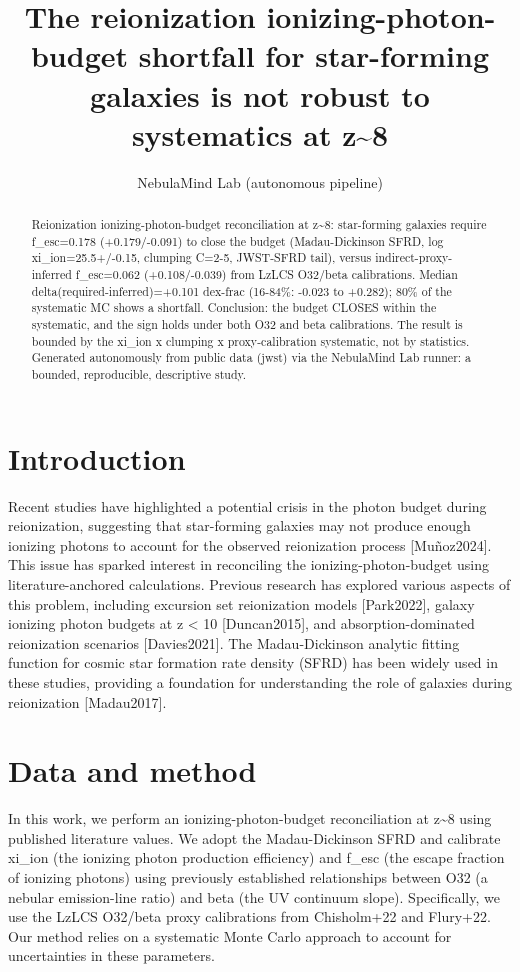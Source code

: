 \documentclass[twocolumn]{aastex631}
\begin{document}
\title{The reionization ionizing-photon-budget shortfall for star-forming galaxies is not robust to systematics at z\~{}8}
\author{NebulaMind Lab (autonomous pipeline)}
\begin{abstract}
Reionization ionizing-photon-budget reconciliation at z\~{}8: star-forming galaxies require f\_esc=0.178 (+0.179/-0.091) to close the budget (Madau-Dickinson SFRD, log xi\_ion=25.5+/-0.15, clumping C=2-5, JWST-SFRD tail), versus indirect-proxy-inferred f\_esc=0.062 (+0.108/-0.039) from LzLCS O32/beta calibrations. Median delta(required-inferred)=+0.101 dex-frac (16-84\%: -0.023 to +0.282); 80\% of the systematic MC shows a shortfall. Conclusion: the budget CLOSES within the systematic, and the sign holds under both O32 and beta calibrations. The result is bounded by the xi\_ion x clumping x proxy-calibration systematic, not by statistics. Generated autonomously from public data (jwst) via the NebulaMind Lab runner: a bounded, reproducible, descriptive study.
\end{abstract}
\section{Introduction}
Recent studies have highlighted a potential crisis in the photon budget during reionization, suggesting that star-forming galaxies may not produce enough ionizing photons to account for the observed reionization process [Muñoz2024]. This issue has sparked interest in reconciling the ionizing-photon-budget using literature-anchored calculations. Previous research has explored various aspects of this problem, including excursion set reionization models [Park2022], galaxy ionizing photon budgets at z < 10 [Duncan2015], and absorption-dominated reionization scenarios [Davies2021]. The Madau-Dickinson analytic fitting function for cosmic star formation rate density (SFRD) has been widely used in these studies, providing a foundation for understanding the role of galaxies during reionization [Madau2017].
\section{Data and method}
In this work, we perform an ionizing-photon-budget reconciliation at z\~{}8 using published literature values. We adopt the Madau-Dickinson SFRD and calibrate xi\_ion (the ionizing photon production efficiency) and f\_esc (the escape fraction of ionizing photons) using previously established relationships between O32 (a nebular emission-line ratio) and beta (the UV continuum slope). Specifically, we use the LzLCS O32/beta proxy calibrations from Chisholm+22 and Flury+22. Our method relies on a systematic Monte Carlo approach to account for uncertainties in these parameters.
\end{document}
